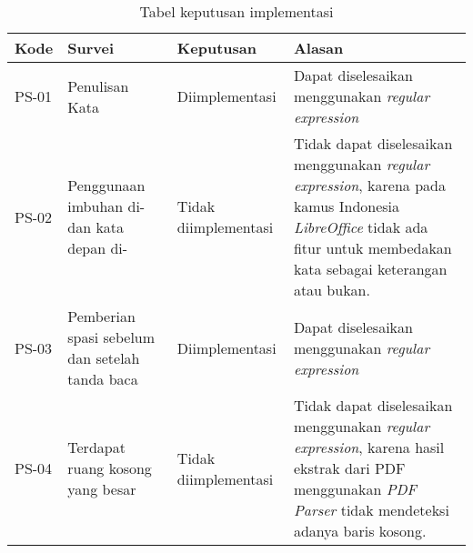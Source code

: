 \begin{table}[H]
	\caption {Tabel keputusan implementasi} \label{tab:keputusan1}
	\begin{center}
		\begin{tabular}{|p{1.5 cm}|>{\raggedright} p{4 cm}| p{2.5 cm}| p{6.5 cm}|}
		\hline
		Kode & Survei & Keputusan & Alasan \\ 
		\hline 
		PS-01 & Penulisan Kata & Diimplementasi & Dapat diselesaikan menggunakan \textit{regular expression} \newline \\ 
		\hline 
		PS-02 & Penggunaan imbuhan di- dan kata depan di- & Tidak \newline diimplementasi & Tidak dapat diselesaikan menggunakan \textit{regular expression}, karena pada kamus Indonesia \textit{LibreOffice} tidak ada fitur untuk membedakan kata sebagai keterangan atau bukan. \newline \\ 
		\hline 
		PS-03 & Pemberian spasi sebelum dan setelah tanda baca & Diimplementasi & Dapat diselesaikan menggunakan \textit{regular expression} \newline \\ 
		\hline 
		PS-04 & Terdapat ruang kosong yang besar & Tidak \newline diimplementasi & Tidak dapat diselesaikan menggunakan \textit{regular expression}, karena hasil ekstrak dari PDF menggunakan \textit{PDF Parser} tidak mendeteksi adanya baris kosong. \newline \\ 
		\hline 
		\end{tabular}
	\end{center}
\end{table}

